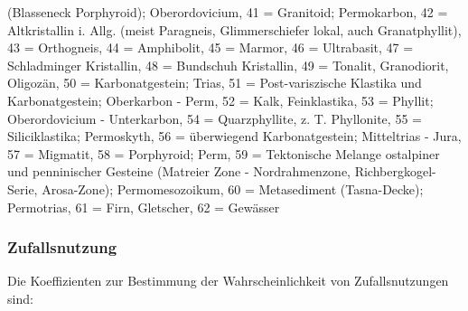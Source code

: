 \documentclass[twocolumn]{scrartcl}
\begin{document}
{  (Blasseneck Porphyroid); Oberordovicium, 41 = Granitoid;
  Permokarbon, 42 = Altkristallin i. Allg. (meist Paragneis,
  Glimmerschiefer lokal, auch Granatphyllit), 43 = Orthogneis, 44 =
  Amphibolit, 45 = Marmor, 46 = Ultrabasit, 47 = Schladminger
  Kristallin, 48 = Bundschuh Kristallin, 49 = Tonalit, Granodiorit,
  Oligozän, 50 = Karbonatgestein; Trias, 51 = Post-variszische
  Klastika und Karbonatgestein; Oberkarbon - Perm, 52 = Kalk,
  Feinklastika, 53 = Phyllit; Oberordovicium - Unterkarbon, 54 =
  Quarzphyllite, z. T. Phyllonite, 55 = Siliciklastika; Permoskyth, 56
  = überwiegend Karbonatgestein; Mitteltrias - Jura, 57 = Migmatit, 58
  = Porphyroid; Perm, 59 = Tektonische Melange ostalpiner und
  penninischer Gesteine (Matreier Zone - Nordrahmenzone,
  Richbergkogel-Serie, Arosa-Zone); Permomesozoikum, 60 = Metasediment
  (Tasna-Decke); Permotrias, 61 = Firn, Gletscher, 62 = Gewässer}

\subsubsection{Zufallsnutzung}

Die Koeffizienten zur Bestimmung der Wahrscheinlichkeit von
Zufallsnutzungen sind:
\end{document}
